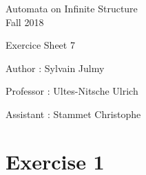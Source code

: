\documentclass[a4paper,11pt]{report}
\author{Sylvain Julmy}
\date{\today}
\begin{document}
\begin{center}
  \Large{
    Automata on Infinite Structure\\
    Fall 2018
  }
  
  \noindent\makebox[\linewidth]{\rule{\linewidth}{0.4pt}}
  Exercice Sheet 7

  \vspace*{1.4cm}

  Author : Sylvain Julmy
  \noindent\makebox[\linewidth]{\rule{\linewidth}{0.4pt}}

  \begin{flushleft}
    Professor : Ultes-Nitsche Ulrich
    
    Assistant : Stammet Christophe
  \end{flushleft}

  \noindent\makebox[\linewidth]{\rule{\textwidth}{1pt}}
\end{center}

\section*{Exercise 1}
\end{document}
